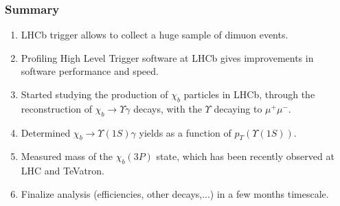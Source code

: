 \documentclass{beamer}
\begin{document}
\begin{frame}
\frametitle{Summary}
\begin{enumerate}
\item LHCb trigger allows to collect a huge sample of dimuon events.
\item Profiling High Level Trigger software at LHCb gives improvements in software performance and speed.
\item Started studying the production of $\chi_b$ particles in LHCb, through the reconstruction of $\chi_b \rightarrow \Upsilon \gamma$ decays, with the $\Upsilon$ decaying to $\mu^+ \mu^-$.
\item Determined $\chi_b \rightarrow \Upsilon(1S) \gamma$ yields as a function of $p_{T}(\Upsilon(1S))$.
\item Measured  mass of the $\chi_b(3P)$ state, which has been recently observed at LHC and TeVatron.
\item Finalize analysis (efficiencies, other decays,...) in a few months timescale.
\end{enumerate}
\end{frame}



\end{document}
